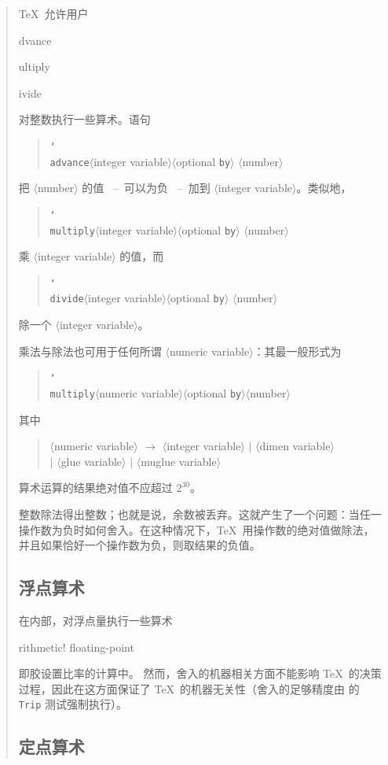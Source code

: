 \documentclass[a4paper]{rapport3}
\makeatletter
\def\nl{\protect\\}\def\n#1{{\tt #1}}\def\cs#1{{\tt\char`\\#1}}\let\csc\cs
\def\gr#1{$\langle$#1$\rangle$}\def\key#1{{\tt#1}}
\def\ldash{\unskip\ --\nobreak\ \ignorespaces}
\def\rdash{\unskip\nobreak\ --\ \ignorespaces}
\newenvironment{disp}{\begin{quotation}}{\end{quotation}}
\newenvironment{Disp}{\begin{quotation}}{\end{quotation}}
\def\term#1\par{\index{#1}}
\def\cstoidx#1\par{\index{#1@\cs{#1}}}
\makeatother
\begin{document}
\begin{disp}
\TeX\ 允许用户
\cstoidx advance\par\cstoidx multiply\par\cstoidx divide\par
对整数执行一些算术。语句
\begin{Disp}\cs{advance}\gr{integer variable}\gr{optional \n{by}}%
     \gr{number}\end{Disp}
把 \gr{number} 的值
 \ldash 可以为负 \rdash 加到 \gr{integer variable}。类似地，
\begin{Disp}\cs{multiply}\gr{integer variable}\gr{optional \n{by}}%
     \gr{number}\end{Disp}
乘 \gr{integer variable} 的值，而
\begin{Disp}\cs{divide}\gr{integer variable}\gr{optional \n{by}}%
     \gr{number}\end{Disp}
除一个 \gr{integer variable}。

乘法与除法也可用于任何所谓 \gr{numeric variable}：其最一般形式为
\begin{disp}\cs{multiply}\gr{numeric variable}\gr{optional \n{by}}\gr{number}
\end{disp}
其中
\begin{disp}\gr{numeric variable} $\longrightarrow$
\gr{integer variable} $|$ \gr{dimen variable}\nl
\indent $|$ \gr{glue variable} $|$ \gr{muglue variable}\end{disp}

算术运算的结果绝对值不应超过
\awp
$2^{30}$。

整数除法得出整数；也就是说，余数被丢弃。这就产生了一个问题：当任一操作数为负时如何舍入。在这种情况下，\TeX\ 用操作数的绝对值做除法，并且如果恰好一个操作数为负，则取结果的负值。

\subsection{浮点算术}

在内部，对浮点量执行一些算术
\term arithmetic! floating-point\par
即胶设置比率的计算中。
然而，舍入的机器相关方面不能影响 \TeX\ 的决策过程，因此在这方面保证了 \TeX\ 的机器无关性（舍入的足够精度由 \cite{K:trip} 的 \n{Trip} 测试强制执行）。

\subsection{定点算术}


\end{disp}
\end{document}
